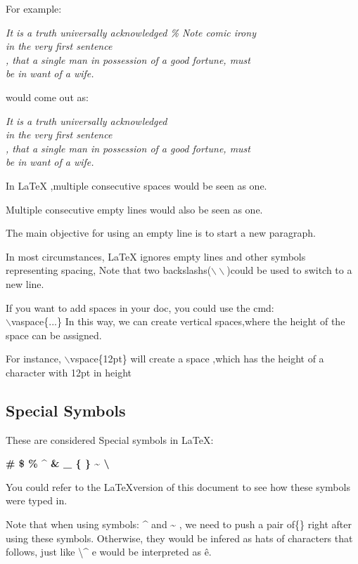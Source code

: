 \documentclass[a4paper,12pt]{article}
\begin{document}
For example:

\noindent\textit{
It is a truth universally acknowledged \% Note comic irony
\\
in the very first sentence
\\
, that a single man in possession of a good fortune, must
\\
be in want of a wife.
}

would come out as:

\noindent\textit{
It is a truth universally acknowledged%
\\
in the very first sentence
\\
, that a single man in possession of a good fortune, must
\\
be in want of a wife.}

In LaTeX ,multiple consecutive spaces would be seen as one.

Multiple consecutive empty lines would also be seen as one.

The main objective for using an empty line is to start a new paragraph.

In most circumstances, LaTeX ignores empty lines and other symbols representing spacing,
Note that two backslashs($\backslash\backslash$)could be used to switch to
a new line.

If you want to add spaces in your doc, 
you could use the cmd: \\$\backslash$vaspace\{...\}
In this way, we can create vertical spaces,where the 
height of the space can be assigned.

For instance, $\backslash$vspace\{12pt\} will create a space
,which has the height of a character with 12pt in height

\subsection{Special Symbols}

These are considered Special symbols in \LaTeX:

\textbf{\# \$ \% \^{} \& \_ \{ \} \~{} \textbackslash} 

You could refer to the \LaTeX version of this document to see 
how these symbols were typed in.

Note that when using symbols: \^{} and \~{} ,
we need to push a pair of\{\} right after using these symbols.
Otherwise, they would be infered as hats of characters that follows,
just like \textbackslash\^{} e would be interpreted as
\^ e.
\end{document}
